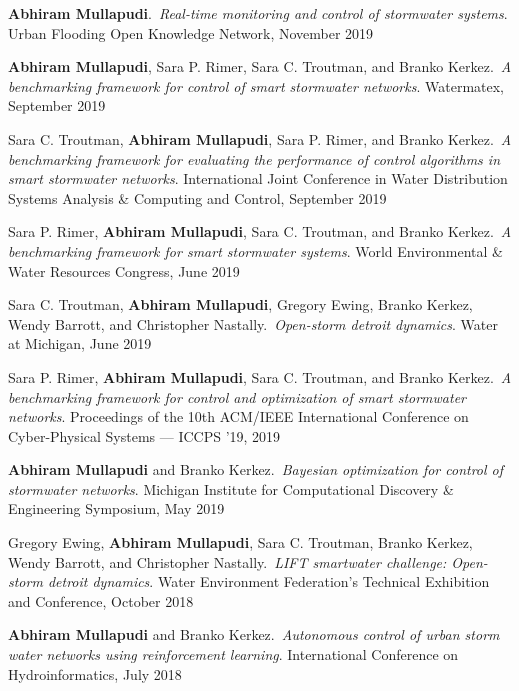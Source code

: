 \documentclass[a4paper,11pt]{article}
\newcommand{\years}[1]{%
  {\reversemarginpar\strut\marginnote{{\small#1}}}%
}
\begin{document}
\years{2019} \textbf{Abhiram Mullapudi}.\ \emph{Real-time monitoring and control of stormwater systems}. Urban Flooding Open Knowledge Network, November 2019\\[.1cm]

\years{2019} \textbf{Abhiram Mullapudi}, Sara P. Rimer, Sara C. Troutman, and Branko Kerkez.\ \emph{A benchmarking framework for control of smart stormwater networks}. Watermatex, September 2019\\[.1cm]

\years{2019} Sara C. Troutman, \textbf{Abhiram Mullapudi}, Sara P. Rimer, and Branko Kerkez.\ \emph{A benchmarking framework for evaluating the performance of control algorithms in smart stormwater networks}. International Joint Conference in Water Distribution Systems Analysis \& Computing and Control, September 2019\\[.1cm]

\years{2019} Sara P. Rimer, \textbf{Abhiram Mullapudi}, Sara C. Troutman, and Branko Kerkez.\ \emph{A benchmarking framework for smart stormwater systems}. World Environmental \& Water Resources Congress, June 2019\\[.1cm]

\years{2019} Sara C. Troutman, \textbf{Abhiram Mullapudi}, Gregory Ewing, Branko Kerkez, Wendy Barrott, and Christopher Nastally.\ \emph{Open-storm detroit dynamics}. Water at Michigan, June 2019\\[.1cm]

\years{2019} Sara P. Rimer, \textbf{Abhiram Mullapudi}, Sara C. Troutman, and Branko Kerkez.\ \emph{A benchmarking framework for control and optimization of smart stormwater networks}. Proceedings of the 10th ACM/IEEE International Conference on Cyber-Physical Systems --- ICCPS ’19, 2019\\[.1cm]

\years{2019} \textbf{Abhiram Mullapudi} and Branko Kerkez.\ \emph{Bayesian optimization for control of stormwater networks}. Michigan Institute for Computational Discovery \& Engineering Symposium, May 2019\\[.1cm]

\years{2018} Gregory Ewing, \textbf{Abhiram Mullapudi}, Sara C. Troutman, Branko Kerkez, Wendy Barrott, and Christopher Nastally.\ \emph{LIFT smartwater challenge: Open-storm detroit dynamics}. Water Environment Federation's Technical Exhibition and Conference, October 2018\\[.1cm]

\years{2018} \textbf{Abhiram Mullapudi} and Branko Kerkez.\ \emph{Autonomous control of urban storm water networks using reinforcement learning}. International Conference on Hydroinformatics, July 2018\\[.1cm]
\end{document}
